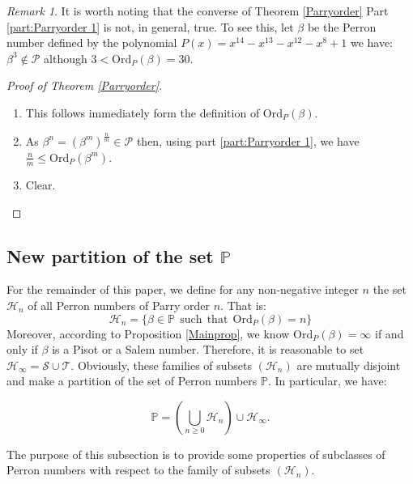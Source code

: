 \documentclass[12pt]{article}
\theoremstyle{plain}
\theoremstyle{remark}
\newtheorem{remark}[theorem]{Remark}
\newcommand{\OrdP}{\mathrm{Ord}_{P}}
\begin{document}
\begin{remark}
    It is worth noting that the converse of Theorem \ref{Parryorder} Part \ref{part:Parryorder 1} is not, in general, true.
    To see this, let $\beta$ be the Perron number defined by the polynomial $P(x)=x^{14}-x^{13}-x^{12}-x^{8}+1$ we have: $\beta^3 \notin \mathcal{P} $ although $ 3< \OrdP(\beta) =30$.
\end{remark}

\begin{proof}[Proof of Theorem \ref{Parryorder}]{\ }
 \begin{enumerate}
 \item This follows immediately form the definition of $\OrdP(\beta)$. 
 \item As $\beta ^n=(\beta ^m)^{\frac{n}{m}} \in \mathcal{P}$ then, using part \ref{part:Parryorder 1}, we have $\frac{n}{m}\leq \OrdP(\beta^m)$. %
 \item Clear. 
 \end{enumerate}
\end{proof}

\subsection[New partition of the set P]{New partition of the set \(\mathbb{P}\) }
 
 For the remainder of this paper, we define for any non-negative integer $n$ the set $\mathcal{H}_n$ of all Perron numbers of Parry order $n$.  That is:
 $$\mathcal{H}_n=\{ \beta \in \mathbb{P} ~~ \mathrm{ such ~~ that } ~~\OrdP(\beta)=n \}$$
Moreover, according to Proposition \ref{Mainprop}, we know $\OrdP(\beta)=\infty$ if and only if $\beta$ is a Pisot or a Salem number. Therefore, it is reasonable to set $\mathcal{H}_\infty=\mathcal{S}\cup \mathcal{T}.$
Obviously, these families of subsets $(\mathcal{H}_n)$ are mutually disjoint and make a partition of the set of Perron numbers $\mathbb{P}$. In particular, we have: 

\begin{equation} \label{P-decomposition}
\mathbb{P} = \left(\bigcup_{n \geq 0} \mathcal{H}_n\right) \cup \mathcal{H}_\infty.
\end{equation}

The purpose of this subsection is to provide some properties of subclasses of Perron numbers with respect to the family of subsets $(\mathcal{H}_n)$.
\end{document}
